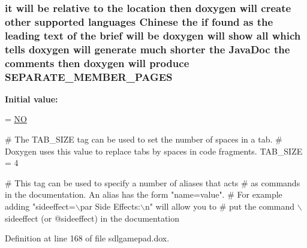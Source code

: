 \hypertarget{sdlgamepad_8dox_ad72e646b31fc3060000bd36feea98bbc}{
\subsubsection[{S\-E\-P\-A\-R\-A\-T\-E\-\_\-\-M\-E\-M\-B\-E\-R\-\_\-\-P\-A\-G\-E\-S}]{\setlength{\rightskip}{0pt plus 5cm}it will be relative to the {\bf location} then doxygen will create other supported languages {\bf Chinese} the {\bf if} found as the leading text of the brief will be doxygen will show all which tells doxygen will generate much shorter the Java\-Doc the comments then doxygen will produce S\-E\-P\-A\-R\-A\-T\-E\-\_\-\-M\-E\-M\-B\-E\-R\-\_\-\-P\-A\-G\-E\-S}}\label{sdlgamepad_8dox_ad72e646b31fc3060000bd36feea98bbc}
{\bfseries Initial value\-:}
\begin{DoxyCode}
= \hyperlink{sdlgamepad_8dox_a0f6a46245280dc38baf9600906aa1393}{NO}

\textcolor{preprocessor}{# The TAB\_SIZE tag can be used to set the number of spaces in a tab.}
\textcolor{preprocessor}{}\textcolor{preprocessor}{# Doxygen uses this value to replace tabs by spaces in code fragments.}
\textcolor{preprocessor}{}
TAB\_SIZE               = 4

\textcolor{preprocessor}{# This tag can be used to specify a number of aliases that acts}
\textcolor{preprocessor}{}\textcolor{preprocessor}{# as commands in the documentation. An alias has the form "name=value".}
\textcolor{preprocessor}{}\textcolor{preprocessor}{# For example adding "sideeffect=\(\backslash\)par Side Effects:\(\backslash\)n" will allow you to}
\textcolor{preprocessor}{# put the command \(\backslash\)sideeffect (or @sideeffect) in the documentation}
\end{DoxyCode}


Definition at line 168 of file sdlgamepad.\-dox.

